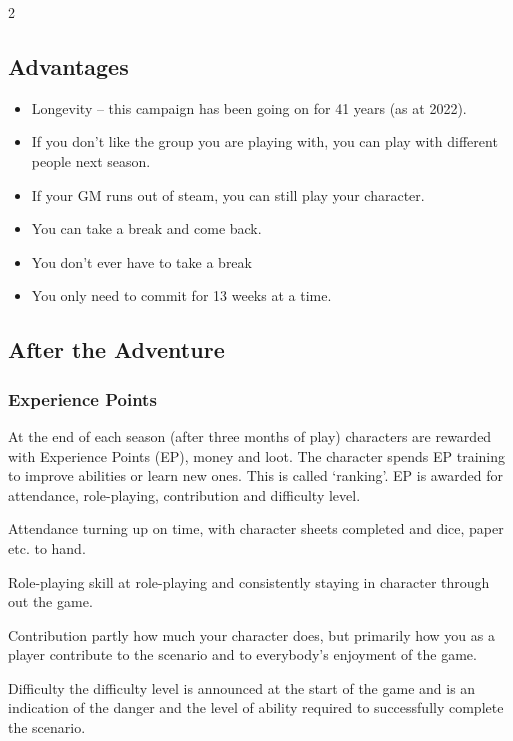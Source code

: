 \begin{multicols}{2}
\subsection{Advantages}

\begin{itemize}

\item Longevity – this campaign has been going on for 41 years (as at
  2022).
\item If you don’t like the group you are playing with, you can play
  with different people next season.
\item If your GM runs out of steam, you can still play your character.
\item You can take a break and come back.
\item You don’t ever have to take a break
\item You only need to commit for 13 weeks at a time.

\end{itemize}

\subsection{After the Adventure}

\subsubsection{Experience Points}

At the end of each season (after three months of play) characters are
rewarded with Experience Points (EP), money and loot.  The character
spends EP training to improve abilities or learn new ones. This is
called ‘ranking’. EP is awarded for attendance, role-playing,
contribution and difficulty level.

\begin{description}
\item{Attendance} turning up on time, with character sheets completed
  and dice, paper etc. to hand.
\item{Role-playing} skill at role-playing and consistently staying in
  character through out the game.
\item{Contribution} partly how much your character does, but primarily
  how you as a player contribute to the scenario and to everybody’s
  enjoyment of the game.
\item{Difficulty} the difficulty level is announced at the start of
  the game and is an indication of the danger and the level of ability
  required to successfully complete the scenario.
\end{description}


\end{multicols}
